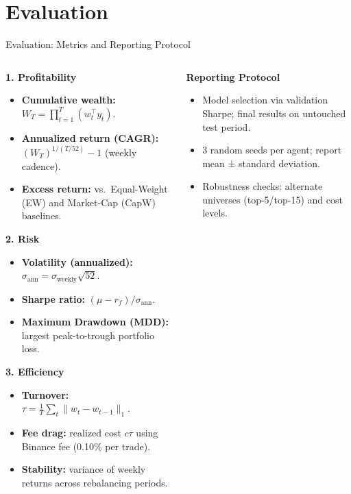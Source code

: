 \documentclass[aspectratio=169]{beamer}
\begin{document}
\section{Evaluation}

\begin{frame}{Evaluation: Metrics and Reporting Protocol}
\scriptsize
\setlength{\itemsep}{1.5pt}\setlength{\parskip}{0pt}\setlength{\topsep}{1pt}
\begin{columns}[T,totalwidth=\textwidth]
\begin{column}{0.7\textwidth}
\textbf{1. Profitability}
\begin{itemize}
  \item \textbf{Cumulative wealth:} $W_T=\prod_{t=1}^T(w_t^\top y_t)$.
  \item \textbf{Annualized return (CAGR):} $(W_T)^{1/(T/52)} - 1$ (weekly cadence).
  \item \textbf{Excess return:} vs.\ Equal-Weight (EW) and Market-Cap (CapW) baselines.
\end{itemize}

\textbf{2. Risk}
\begin{itemize}
  \item \textbf{Volatility (annualized):} $\sigma_{\text{ann}}=\sigma_{\text{weekly}}\sqrt{52}$.
  \item \textbf{Sharpe ratio:} $(\mu - r_f)/\sigma_{\text{ann}}$.
  \item \textbf{Maximum Drawdown (MDD):} largest peak-to-trough portfolio loss.
\end{itemize}

\textbf{3. Efficiency}
\begin{itemize}
  \item \textbf{Turnover:} $\tau=\frac{1}{T}\sum_t \lVert w_t-w_{t-1}\rVert_1$.
  \item \textbf{Fee drag:} realized cost $c\tau$ using Binance fee (0.10\% per trade).
  \item \textbf{Stability:} variance of weekly returns across rebalancing periods.
\end{itemize}
\end{column}


\begin{column}{0.3\textwidth}
\textbf{Reporting Protocol}
\begin{itemize}
  \item Model selection via validation Sharpe; final results on untouched test period.
  \item 3 random seeds per agent; report mean ± standard deviation.
  \item Robustness checks: alternate universes (top-5/top-15) and cost levels.
\end{itemize}


\end{column}
\end{columns}
\end{frame}
\end{document}
